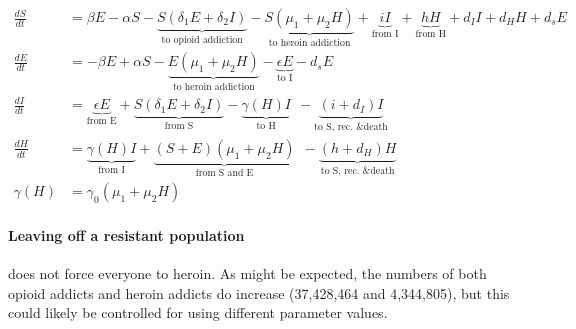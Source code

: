 \documentclass[11pt]{report}
\begin{document}
\begin{align*}
\frac{dS}{dt} &= \beta E - \alpha S - \underbrace{S(\delta_1 E + \delta_2 I)}_{\text{to opioid addiction}} - \underbrace{S(\mu_1+\mu_2H)}_{\text{to heroin addiction}} 
+ \underbrace{iI}_{\text{from I}} + \underbrace{hH}_{\text{from H}} 
+ d_I I + d_H H + d_s E\\
\frac{dE}{dt} &= - \beta E + \alpha S - \underbrace{E(\mu_1 + \mu_2H)}_{\text{to heroin addiction}} - \underbrace{\epsilon E}_{\text{to I}} - d_s E\\
\frac{dI}{dt} &= \underbrace{\epsilon E}_{\text{from E}} + \underbrace{S(\delta_1E+\delta_2I)}_{\text{from S}} - \underbrace{\gamma(H)I}_{\text{to H}}\ \ 
- \underbrace{(i+d_I)I}_{\text{to S, rec. \& death}}\\
\frac{dH}{dt} &= \underbrace{\gamma(H)I}_{\text{from I}} + \underbrace{(S+E)(\mu_1+\mu_2H)}_{\text{from S and E}}\ \ - \underbrace{(h+d_H)H}_{\text{to S, rec. \& death}}\\
\gamma(H) &= \gamma_0(\mu_1+\mu_2H)
\end{align*}

\paragraph{Leaving off a resistant population} does not force everyone to heroin. As might be expected, the numbers of both opioid addicts and heroin addicts do increase (37,428,464 and 4,344,805), but this could likely be controlled for using different parameter values.
\end{document}
